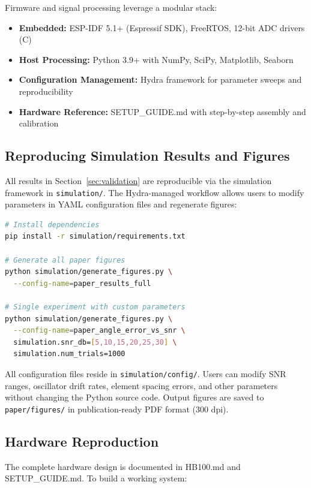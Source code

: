 \documentclass[10pt,a4paper]{article}
\begin{document}
Firmware and signal processing leverage a modular stack:

\begin{itemize}
\item \textbf{Embedded:} ESP-IDF 5.1+ (Espressif SDK), FreeRTOS, 12-bit ADC drivers (C)
\item \textbf{Host Processing:} Python 3.9+ with NumPy, SciPy, Matplotlib, Seaborn
\item \textbf{Configuration Management:} Hydra framework for parameter sweeps and reproducibility
\item \textbf{Hardware Reference:} SETUP\_GUIDE.md with step-by-step assembly and calibration
\end{itemize}

\subsection{Reproducing Simulation Results and Figures}

All results in Section~\ref{sec:validation} are reproducible via the simulation framework in \texttt{simulation/}.
The Hydra-managed workflow allows users to modify parameters in YAML configuration files and regenerate figures:

\begin{lstlisting}[language=bash, basicstyle=\ttfamily\footnotesize]
# Install dependencies
pip install -r simulation/requirements.txt

# Generate all paper figures
python simulation/generate_figures.py \
  --config-name=paper_results_full

# Single experiment with custom parameters
python simulation/generate_figures.py \
  --config-name=paper_angle_error_vs_snr \
  simulation.snr_db=[5,10,15,20,25,30] \
  simulation.num_trials=1000
\end{lstlisting}

All configuration files reside in \texttt{simulation/config/}. Users can modify SNR ranges, oscillator drift
rates, element spacing errors, and other parameters without changing the Python source code.
Output figures are saved to \texttt{paper/figures/} in publication-ready PDF format (300 dpi).

\subsection{Hardware Reproduction}

The complete hardware design is documented in HB100.md and SETUP\_GUIDE.md. To build a working system:
\end{document}
